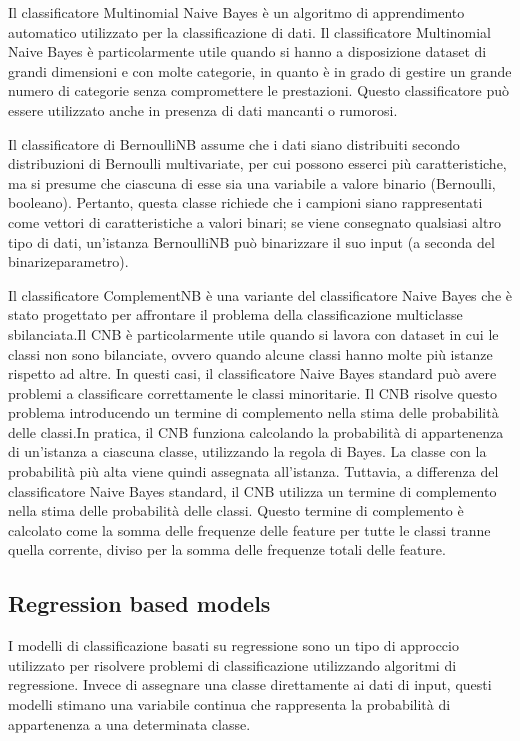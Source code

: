 \documentclass[italian,12pt,a4paper]{article}
\begin{document}
    
    Il classificatore Multinomial Naive Bayes è un algoritmo di apprendimento automatico utilizzato per la classificazione di dati. Il classificatore Multinomial Naive Bayes è particolarmente utile quando si hanno a disposizione dataset di grandi dimensioni e con molte categorie, in quanto è in grado di gestire un grande numero di categorie senza compromettere le prestazioni. Questo classificatore  può essere utilizzato anche in presenza di dati mancanti o rumorosi.
    \\
    \vspace{25pt}

     
    Il classificatore di BernoulliNB assume che i dati siano distribuiti secondo distribuzioni di Bernoulli multivariate, per cui possono esserci più caratteristiche, ma si presume che ciascuna di esse sia una variabile a valore binario (Bernoulli, booleano). Pertanto, questa classe richiede che i campioni siano rappresentati come vettori di caratteristiche a valori binari; se viene consegnato qualsiasi altro tipo di dati, un'istanza BernoulliNB può binarizzare il suo input (a seconda del binarizeparametro).
    \\
    \vspace{25pt}

    
    Il classificatore ComplementNB è una variante del classificatore Naive Bayes che è stato progettato per affrontare il problema della classificazione multiclasse sbilanciata.Il CNB è particolarmente utile quando si lavora con dataset in cui le classi non sono bilanciate, ovvero quando alcune classi hanno molte più istanze rispetto ad altre. In questi casi, il classificatore Naive Bayes standard può avere problemi a classificare correttamente le classi minoritarie. Il CNB risolve questo problema introducendo un termine di complemento nella stima delle probabilità delle classi.In pratica, il CNB funziona calcolando la probabilità di appartenenza di un'istanza a ciascuna classe, utilizzando la regola di Bayes. La classe con la probabilità più alta viene quindi assegnata all'istanza. Tuttavia, a differenza del classificatore Naive Bayes standard, il CNB utilizza un termine di complemento nella stima delle probabilità delle classi. Questo termine di complemento è calcolato come la somma delle frequenze delle feature per tutte le classi tranne quella corrente, diviso per la somma delle frequenze totali delle feature.
    \\
    \vspace{25pt}
    \subsection{Regression based models}
    I modelli di classificazione basati su regressione sono un tipo di approccio utilizzato per risolvere problemi di classificazione utilizzando algoritmi di regressione. Invece di assegnare una classe direttamente ai dati di input, questi modelli stimano una variabile continua che rappresenta la probabilità di appartenenza a una determinata classe.
    \\
    \vspace{25pt}
\end{document}
